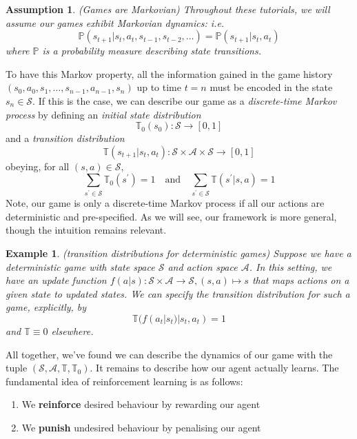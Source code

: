 \documentclass[12pt]{article}
\newtheorem{example}{Example}
\newtheorem{assumption}{Assumption}
\begin{document}
\begin{assumption}(Games are Markovian)
    Throughout these tutorials, we will assume our games exhibit Markovian dynamics: i.e. 
    $$\mathbb{P}(s_{t+1} | s_t, a_t, s_{t-1}, s_{t-2}, \dots) = \mathbb{P}(s_{t+1} | s_t, a_t)$$
    where $\mathbb{P}$ is a probability measure describing state transitions. 
\end{assumption}

To have this Markov property, all the information gained in the game history $(s_0, a_0, s_1, \dots, s_{n-1}, a_{n-1}, s_n)$ up 
to time $t=n$ must be encoded in the state $s_n \in \mathcal{S}$. If this is the case, we can describe our game as a 
\textit{discrete-time Markov process} by defining an \textit{initial state distribution}
$$
\mathbb{T}_0(s_0): \mathcal{S} \to [0, 1]
$$
and a \textit{transition distribution}
$$
\mathbb{T}(s_{t+1} | s_t, a_t): \mathcal{S} \times \mathcal{A} \times \mathcal{S} \to [0,1]
$$
obeying, for all $(s, a) \in \mathcal{S}$,
$$
\sum_{s^\prime \in \mathcal{S}} \mathbb{T}_0(s^\prime) = 1 \quad \text{and} \quad 
\sum_{s^\prime \in \mathcal{S}} \mathbb{T}(s^\prime | s, a) = 1
$$
Note, our game is only a discrete-time Markov process if all our actions are deterministic and pre-specified. As we will see, 
our framework is more general, though the intuition remains relevant.

\begin{example}{(transition distributions for deterministic games)}
    Suppose we have a deterministic game with state space $\mathcal{S}$ and action space $\mathcal{A}$. In this setting, we 
    have an update function $f(a | s): \mathcal{S} \times \mathcal{A} \to \mathcal{S}, (s, a) \mapsto s$ that maps actions on 
    a given state to updated states. We can specify the transition distribution for such a game, explicitly, by
    $$
    \mathbb{T}(f(a_t | s_t) | s_t, a_t) = 1
    $$
    and $\mathbb{T} \equiv 0$ elsewhere.
\end{example}

All together, we've found we can describe the dynamics of our game with the tuple $(\mathcal{S}, \mathcal{A}, \mathbb{T}, \mathbb{T}_0)$. 
It remains to describe how our agent actually learns. The fundamental idea of reinforcement learning is as follows: 

\begin{enumerate}
    \item We \textbf{reinforce} desired behaviour by rewarding our agent
    \item We \textbf{punish} undesired behaviour by penalising our agent
\end{enumerate}
\end{document}
